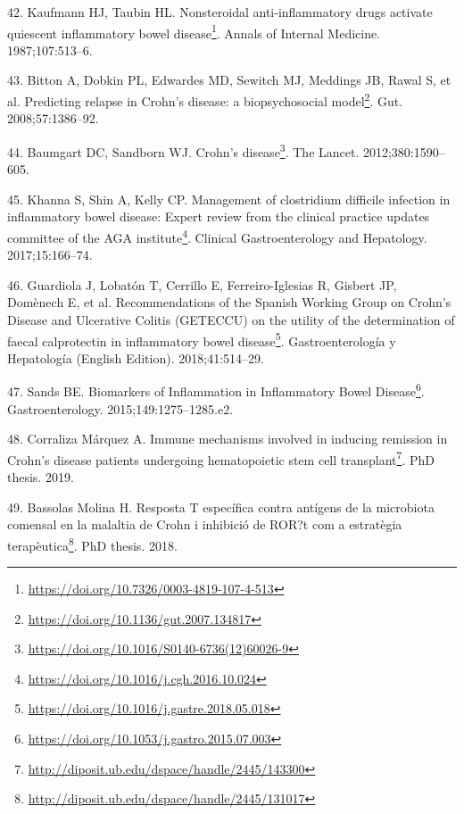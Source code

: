 \documentclass[
  a4paper,
]{book}
\DeclareRobustCommand{\href}[2]{#2\footnote{\url{#1}}}
\newlength{\cslhangindent}
\newlength{\cslentryspacingunit} %
\newenvironment{CSLReferences}[2] %
 {%
  \setlength{\parindent}{0pt}
  \ifodd #1
  \let\oldpar\par
  \def\par{\hangindent=\cslhangindent\oldpar}
  \fi
  \setlength{\parskip}{#2\cslentryspacingunit}
 }%
 {}
\begin{document}
\begin{CSLReferences}{0}{0}
\leavevmode{}%
42. Kaufmann HJ, Taubin HL. \href{https://doi.org/10.7326/0003-4819-107-4-513}{Nonsteroidal anti-inflammatory drugs activate quiescent inflammatory bowel disease}. Annals of Internal Medicine. 1987;107:513--6.

\leavevmode{}%
43. Bitton A, Dobkin PL, Edwardes MD, Sewitch MJ, Meddings JB, Rawal S, et al. \href{https://doi.org/10.1136/gut.2007.134817}{Predicting relapse in Crohn's disease: a biopsychosocial model}. Gut. 2008;57:1386--92.

\leavevmode{}%
44. Baumgart DC, Sandborn WJ. \href{https://doi.org/10.1016/S0140-6736(12)60026-9}{Crohn's disease}. The Lancet. 2012;380:1590--605.

\leavevmode{}%
45. Khanna S, Shin A, Kelly CP. \href{https://doi.org/10.1016/j.cgh.2016.10.024}{Management of clostridium difficile infection in inflammatory bowel disease: Expert review from the clinical practice updates committee of the AGA institute}. Clinical Gastroenterology and Hepatology. 2017;15:166--74.

\leavevmode{}%
46. Guardiola J, Lobatón T, Cerrillo E, Ferreiro-Iglesias R, Gisbert JP, Domènech E, et al. \href{https://doi.org/10.1016/j.gastre.2018.05.018}{Recommendations of the Spanish Working Group on Crohn's Disease and Ulcerative Colitis (GETECCU) on the utility of the determination of faecal calprotectin in inflammatory bowel disease}. Gastroenterología y Hepatología (English Edition). 2018;41:514--29.

\leavevmode{}%
47. Sands BE. \href{https://doi.org/10.1053/j.gastro.2015.07.003}{Biomarkers of Inflammation in Inflammatory Bowel Disease}. Gastroenterology. 2015;149:1275--1285.e2.

\leavevmode{}%
48. Corraliza Márquez A. \href{http://diposit.ub.edu/dspace/handle/2445/143300}{Immune mechanisms involved in inducing remission in Crohn{'}s disease patients undergoing hematopoietic stem cell transplant}. PhD thesis. 2019.

\leavevmode{}%
49. Bassolas Molina H. \href{http://diposit.ub.edu/dspace/handle/2445/131017}{Resposta T específica contra antígens de la microbiota comensal en la malaltia de Crohn i inhibició de ROR?t com a estratègia terapèutica}. PhD thesis. 2018.


\end{CSLReferences}
\end{document}
